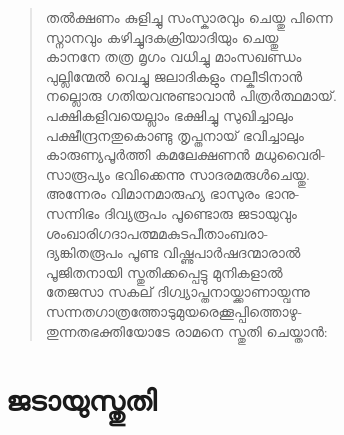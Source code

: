 \begin{verse}
തല്‍ക്ഷണം കുളിച്ചു സംസ്കാരവും ചെയ്തു പിന്നെ\\
സ്നാനവും കഴിച്ചുദകക്രിയാദിയും ചെയ്തു\\
കാനനേ തത്ര മൃഗം വധിച്ചു മാംസഖണ്ഡം\\
പുല്ലിന്മേല്‍ വെച്ചു ജലാദികളും നല്കീടിനാന്‍\\
നല്ലൊരു ഗതിയവനുണ്ടാവാന്‍ പിത്രര്‍ത്ഥമായ്.\\
പക്ഷികളിവയെല്ലാം ഭക്ഷിച്ചു സുഖിച്ചാലും\\
പക്ഷീന്ദ്രനതുകൊണ്ടു തൃപ്തനായ് ഭവിച്ചാലും\\
കാരുണ്യപൂര്‍ത്തി കമലേക്ഷണന്‍ മധുവൈരി-\\
സാരൂപ്യം ഭവിക്കെന്നു സാദരമരുള്‍ചെയ്തു.\\
അന്നേരം വിമാനമാരുഹ്യ ഭാസുരം ഭാനു-\\
സന്നിഭം ദിവ്യരൂപം പൂണ്ടൊരു ജടായുവും\\
ശംഖാരിഗദാപത്മമകുടപീതാംബരാ-\\
ദ്യങ്കിതരൂപം പൂണ്ട വിഷ്ണുപാര്‍ഷദന്മാരാല്‍\\
പൂജിതനായി സ്തുതിക്കപ്പെട്ടു മുനികളാല്‍\\
തേജസാ സകല് ദിഗ്വ്യാപ്തനായ്ക്കാണായ്വന്നു\\
സന്നതഗാത്രത്തോടുമുയരെക്കൂപ്പിത്തൊഴു-\\
തുന്നതഭക്തിയോടേ രാമനെ സ്തുതി ചെയ്താന്‍:
\end{verse}

\section{ജടായുസ്തുതി}

